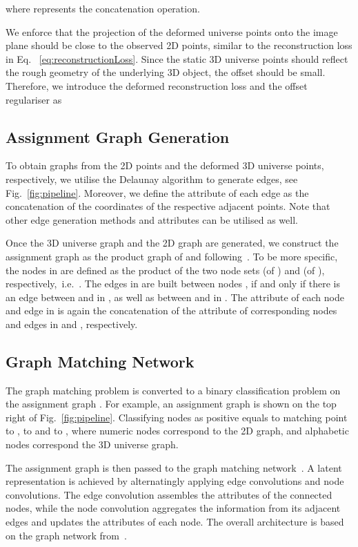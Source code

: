 where  represents the concatenation operation.

 We enforce that the projection of the deformed universe points onto the image plane should be close to the observed 2D points, similar to the reconstruction loss in Eq. ~\eqref{eq:reconstructionLoss}.
Since the static 3D universe points should reflect the rough geometry of the underlying 3D object, the offset  should be small.
Therefore, we introduce the deformed reconstruction loss and the offset regulariser as
    


\subsection{Assignment Graph Generation}\label{sec:assignment}
To obtain graphs from the 2D points and the deformed 3D universe points, respectively, we utilise the Delaunay algorithm \cite{botsch2010polygon} to generate edges, see Fig.~\ref{fig:pipeline}. Moreover, we define the attribute of each edge as the concatenation of the  coordinates of the respective adjacent points. Note that other edge generation methods and attributes can be utilised as well. 

Once the 3D universe graph  and the 2D graph  are generated, we construct the assignment graph  as the product graph of  and  following~\citet{leordeanu2005spectral}.
To be more specific, the nodes in  are defined as the product of the two node sets  (of )  and   (of ), respectively,~i.e.~.
The edges in  are built between nodes ,  if and only if there is an edge between  and  in , as well as between  and  in .
The attribute of each node and edge in  is again the concatenation of the attribute of corresponding nodes and edges in  and , respectively.

\subsection{Graph Matching Network}
The graph matching problem is converted to a binary classification problem on the assignment graph . 
For example, an assignment graph is shown on the top right of Fig.~\ref{fig:pipeline}.
Classifying nodes  as positive equals to matching point  to ,  to  and  to , where numeric nodes correspond to the 2D graph, and alphabetic nodes correspond the 3D universe graph.

The assignment graph is then passed to the graph matching network~\cite{wang2020combinatorial}. A latent representation is achieved by alternatingly applying edge convolutions and node convolutions.
The edge convolution assembles the attributes of the connected nodes, while the node convolution aggregates the information from its adjacent edges and updates the attributes of each node. The overall architecture is based on the graph network from~\citet{battaglia2018relational}.




